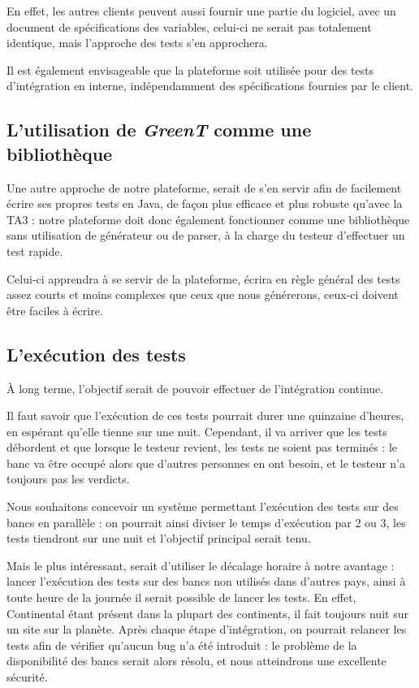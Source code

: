 	En effet, les autres clients peuvent aussi fournir une partie du logiciel, avec un document de spécifications des variables, celui-ci ne serait pas totalement identique, mais l'approche des tests s'en approchera.

	Il est également envisageable que la plateforme soit utilisée pour des tests d'intégration en interne, indépendamment des spécifications fournies par le client.

	\subsection{L'utilisation de \textit{GreenT} comme une bibliothèque}
		Une autre approche de notre plateforme, serait de s'en servir afin de facilement écrire ses propres tests en Java, de façon plus efficace et plus robuste qu'avec la TA3 : notre plateforme doit donc également fonctionner comme une bibliothèque sans utilisation de générateur ou de parser, à la charge du testeur d'effectuer un test rapide. 

		Celui-ci apprendra à se servir de la plateforme, écrira en règle général des tests assez courts et moins complexes que ceux que nous générerons, ceux-ci doivent être faciles à écrire.

	\subsection{L'exécution des tests}
	À long terme, l'objectif serait de pouvoir effectuer de l'intégration continue. 

	Il faut savoir que l'exécution de ces tests pourrait durer une quinzaine d'heures, en espérant qu'elle tienne sur une nuit. Cependant, il va arriver que les tests débordent et que lorsque le testeur revient, les tests ne soient pas terminés : le banc va être occupé alors que d'autres personnes en ont besoin, et le testeur n'a toujours pas les verdicts.

	 Nous souhaitons concevoir un système permettant l'exécution des tests sur des bancs en parallèle : on pourrait ainsi diviser le temps d'exécution par 2 ou 3, les tests tiendront sur une nuit et l'objectif principal serait tenu.

	 Mais le plus intéressant, serait d'utiliser le décalage horaire à notre avantage : lancer l'exécution des tests sur des bancs non utilisés dans d'autres pays, ainsi à toute heure de la journée il serait possible de lancer les tests. En effet, Continental étant présent dans la plupart des continents, il fait toujours nuit sur un site sur la planète. Après chaque étape d'intégration, on pourrait relancer les tests afin de vérifier qu'aucun bug n'a été introduit : le problème de la disponibilité des bancs serait alors résolu, et nous atteindrons une excellente sécurité.

